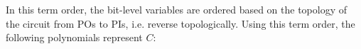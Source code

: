 \begin{Example}
{In this term order, the bit-level variables are ordered
based on the topology of the circuit from POs to PIs, i.e. reverse
topologically. Using this term order, the following polynomials
represent $C$:
}
\end{Example}
